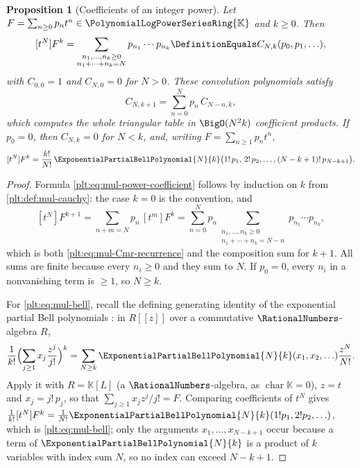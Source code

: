 \documentclass[11pt,oneside]{article}
\theoremstyle{plain}
\newtheorem{proposition}[theorem]{Proposition}
\theoremstyle{definition}
\theoremstyle{remark}
\newcommand{\K}{\mathbb{K}}
\newcommand{\PLpow}{\PolynomialLogPowerSeriesRing{\K}}   %
\begin{document}
\begin{proposition}[Coefficients of an integer power]
\label{plt:prop:mul-integer-power}
Let $F=\sum_{n\ge0}p_nt^n\in\PLpow$ and $k\ge0$.  Then
\begin{equation}\label{plt:eq:mul-power-coefficient}
 [t^N]F^k
 =\sum_{\substack{n_1,\ldots,n_k\ge0\\ n_1+\cdots+n_k=N}}
   p_{n_1}\cdots p_{n_k}
 \DefinitionEquals C_{N,k}(p_0,p_1,\ldots),
\end{equation}
with $C_{0,0}=1$ and $C_{N,0}=0$ for $N>0$.  These \emph{convolution
polynomials} satisfy
\begin{equation}\label{plt:eq:mul-Cmr-recurrence}
 C_{N,k+1}=\sum_{n=0}^{N}p_n\,C_{N-n,k},
\end{equation}
which computes the whole triangular table in $\BigO(N^2k)$ coefficient
products.  If $p_0=0$, then $C_{N,k}=0$ for $N<k$, and, writing
$F=\sum_{n\ge1}p_nt^n$,
\begin{equation}\label{plt:eq:mul-bell}
 [t^N]F^k
 =\frac{k!}{N!}\,
 \ExponentialPartialBellPolynomial{N}{k}
   \bigl(1!\,p_1,\,2!\,p_2,\ldots,(N-k+1)!\,p_{N-k+1}\bigr).
\end{equation}
\end{proposition}

\begin{proof}
Formula \eqref{plt:eq:mul-power-coefficient} follows by induction on $k$ from
\cref{plt:def:mul-cauchy}: the case $k=0$ is the convention, and
\[
 [t^N]F^{k+1}=\sum_{n+m=N}p_n\,[t^m]F^k
 =\sum_{n=0}^{N}p_n\!\!\!\!\sum_{\substack{n_1,\ldots,n_k\ge0\\
   n_1+\cdots+n_k=N-n}}\!\!\!\!
   p_{n_1}\cdots p_{n_k},
\]
which is both \eqref{plt:eq:mul-Cmr-recurrence} and the composition sum for
$k+1$.  All sums are finite because every $n_i\ge0$ and they sum to $N$.  If
$p_0=0$, every $n_i$ in a nonvanishing term is $\ge1$, so $N\ge k$.

For \eqref{plt:eq:mul-bell}, recall the defining generating identity of the
exponential partial Bell polynomials \cite{comtet-book,comtet1970}: in
$R[[z]]$ over a commutative $\RationalNumbers$-algebra $R$,
\[
 \frac1{k!}\Bigl(\sum_{j\ge1}x_j\frac{z^j}{j!}\Bigr)^{k}
 =\sum_{N\ge k}\ExponentialPartialBellPolynomial{N}{k}(x_1,x_2,\ldots)
   \frac{z^N}{N!}.
\]
Apply it with $R=\K[L]$ (a $\RationalNumbers$-algebra, as
$\operatorname{char}\K=0$), $z=t$ and $x_j=j!\,p_j$, so that
$\sum_{j\ge1}x_jz^j/j!=F$.  Comparing coefficients of $t^N$ gives
$\frac1{k!}[t^N]F^k=\frac1{N!}
\ExponentialPartialBellPolynomial{N}{k}(1!p_1,2!p_2,\ldots)$, which is
\eqref{plt:eq:mul-bell}; only the arguments $x_1,\ldots,x_{N-k+1}$ occur
because a term of $\ExponentialPartialBellPolynomial{N}{k}$ is a product of
$k$ variables with index sum $N$, so no index can exceed $N-k+1$.
\end{proof}
\end{document}
